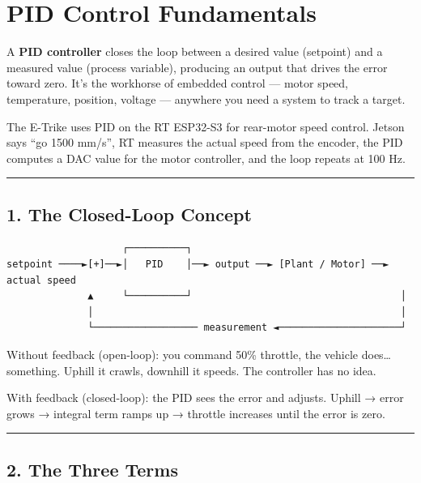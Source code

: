 \documentclass[12pt,a4paper,oneside]{report}
\begin{document}
\chapter{PID Control Fundamentals}\label{pid-control-fundamentals}

A \textbf{PID controller} closes the loop between a desired value (setpoint) and
a measured value (process variable), producing an output that drives the error
toward zero. It's the workhorse of embedded control --- motor speed,
temperature, position, voltage --- anywhere you need a system to track a target.

The E-Trike uses PID on the RT ESP32-S3 for rear-motor speed control. Jetson
says ``go 1500 mm/s'', RT measures the actual speed from the encoder, the PID
computes a DAC value for the motor controller, and the loop repeats at 100 Hz.

\begin{center}\rule{0.5\linewidth}{0.5pt}\end{center}

\section{1. The Closed-Loop Concept}\label{the-closed-loop-concept}

\begin{verbatim}
                    ┌──────────┐
setpoint ────►[+]──►│   PID    │──► output ──► [Plant / Motor] ──► actual speed
              ▲     └──────────┘                                    │
              │                                                     │
              └────────────────── measurement ◄─────────────────────┘
\end{verbatim}

Without feedback (open-loop): you command 50\% throttle, the vehicle
does\ldots{} something. Uphill it crawls, downhill it speeds. The controller has
no idea.

With feedback (closed-loop): the PID sees the error and adjusts. Uphill → error
grows → integral term ramps up → throttle increases until the error is zero.

\begin{center}\rule{0.5\linewidth}{0.5pt}\end{center}

\section{2. The Three Terms}\label{the-three-terms}
\end{document}
